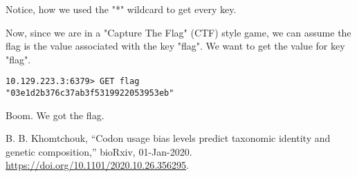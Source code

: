 \documentclass[conference]{IEEEtran}
\begin{document}
Notice, how we used the "*" wildcard to get every key.

Now, since we are in a "Capture The Flag" (CTF) style game, we can assume the flag is the value associated with the key "flag". We want to get the value for key "flag".

\begin{scriptsize}
\begin{verbatim}
10.129.223.3:6379> GET flag
"03e1d2b376c37ab3f5319922053953eb"
\end{verbatim}
\end{scriptsize}

Boom. We got the flag.


\begin{thebibliography}{00}

 B. B. Khomtchouk, “Codon usage bias levels predict taxonomic identity and genetic composition,” bioRxiv, 01-Jan-2020. \url{https://doi.org/10.1101/2020.10.26.356295}.

\end{thebibliography}
\vspace{12pt}
\end{document}
